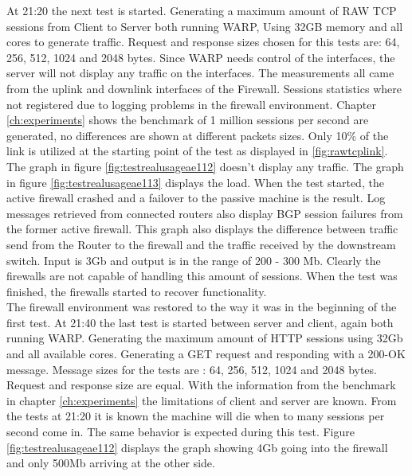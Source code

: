 At 21:20 the next test is started. Generating a maximum amount of RAW TCP sessions from Client to Server both running WARP, Using 32GB memory and all cores to generate traffic.
Request and response sizes chosen for this tests are: 64, 256, 512, 1024 and 2048 bytes. 
Since WARP needs control of the interfaces, the server will not display any traffic on the interfaces. 
The measurements all came from the uplink and downlink interfaces of the Firewall. 
Sessions statistics where not registered due to logging problems in the firewall environment. 
Chapter \ref{ch:experiments} shows the benchmark of 1 million sessions per second are generated, no differences are shown at different packets sizes. 
Only 10\% of the link is utilized at the starting point of the test as displayed in \ref{fig:rawtcplink}. The graph in figure \ref{fig:testrealusageae112} doesn't display any traffic. 
The graph in figure \ref{fig:testrealusageae113} displays the load. When the test started, the active firewall crashed and a failover to the passive machine is the result. Log messages retrieved from connected routers also display BGP session failures from the former active firewall. 
This graph also displays the difference between traffic send from the Router to the firewall and the traffic received by the downstream switch. 
Input is 3Gb and output is in the range of 200 - 300 Mb. Clearly the firewalls are not capable of handling this amount of sessions. 
When the test was finished, the firewalls started to recover functionality. \\ 

The firewall environment was restored to the way it was in the beginning of the first test.
At 21:40 the last test is started between server and client, again both running WARP. Generating the maximum amount of HTTP sessions using 32Gb and all available cores.
Generating a GET request and responding with a 200-OK message. 
Message sizes for the tests are : 64, 256, 512, 1024 and 2048 bytes. Request and response size are equal. 
With the information from the benchmark in chapter \ref{ch:experiments} the limitations of client and server are known. 
From the tests at 21:20 it is known the machine will die when to many sessions per second come in. The same behavior is expected during this test.
Figure \ref{fig:testrealusageae112} displays the graph showing 4Gb going into the firewall and only 500Mb arriving at the other side.


